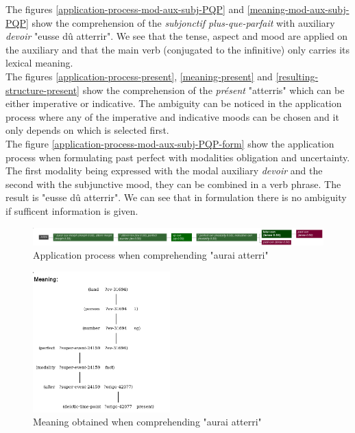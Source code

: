 \documentclass[a4paper,10pt]{article}
\begin{document}
The figures \ref{application-process-mod-aux-subj-PQP} and \ref{meaning-mod-aux-subj-PQP} show the comprehension of the \textit{subjonctif plus-que-parfait} with auxiliary \textit{devoir} "eusse dû atterrir". We see that the tense, aspect and mood are applied on the auxiliary and that the main verb (conjugated to the infinitive) only carries its lexical meaning. \\

The figures \ref{application-process-present}, \ref{meaning-present} and \ref{resulting-structure-present} show the comprehension of the \textit{présent} "atterris" which can be either imperative or indicative. The ambiguity can be noticed in the application process where any of the imperative and indicative moods can be chosen and it only depends on which is selected first. \\

The figure \ref{application-process-mod-aux-subj-PQP-form} show the application process when formulating past perfect with modalities obligation and uncertainty. The first modality being expressed with the modal auxiliary \textit{devoir} and the second with the subjunctive mood, they can be combined in a verb phrase. The result is "eusse dû atterrir". We can see that in formulation there is no ambiguity if sufficent information is given.

\begin{figure}[!h]
    \centering
    \includegraphics[width=\textwidth]{application-process-FA.png}
    \caption{Application process when comprehending "aurai atterri"}
    \label{application-process-FA}
\end{figure}

\begin{figure}[!h]
    \centering
    \includegraphics[width=200px]{meaning-FA.png}
    \caption{Meaning obtained when comprehending "aurai atterri"}
    \label{meaning-FA}
\end{figure}
\end{document}

